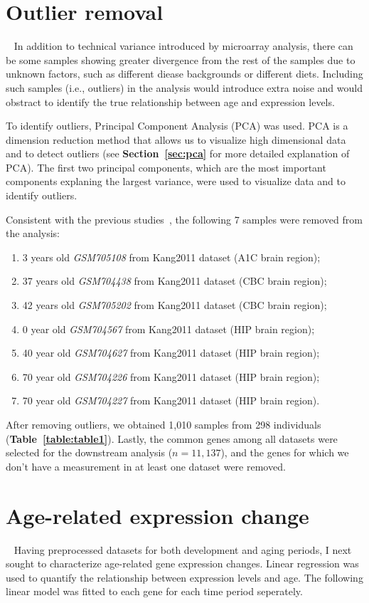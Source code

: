 \section{Outlier removal}~\label{sec:out.rm}
In addition to technical variance introduced by microarray analysis, 
there can be some samples showing greater divergence from the rest of the samples due to unknown factors,
such as different diease backgrounds or different diets.
Including such samples (i.e., outliers) in the analysis would introduce extra noise and would obstract to identify the true relationship between age and expression levels.

To identify outliers, Principal Component Analysis (PCA) was used. 
PCA is a dimension reduction method that allows us to visualize high dimensional data and to detect outliers (see \textbf{Section~\ref{sec:pca}} for more detailed explanation of PCA).
The first two principal components, which are the most important components explaning the largest variance, were used to visualize data and to identify outliers.

Consistent with the previous studies~\cite{Donertas2017,Donertas2018}, the following 7 samples were removed from the analysis: 
\begin{enumerate}
    \item 3 years old \textit{GSM705108} from Kang2011 dataset (A1C brain region);
    \item 37 years old \textit{GSM704438} from Kang2011 dataset (CBC brain region);
    \item 42 years old \textit{GSM705202} from Kang2011 dataset (CBC brain region);
    \item 0 year old \textit{GSM704567} from Kang2011 dataset (HIP brain region);
    \item 40 year old \textit{GSM704627} from Kang2011 dataset (HIP brain region);
    \item 70 year old \textit{GSM704226} from Kang2011 dataset (HIP brain region);
    \item 70 year old \textit{GSM704227} from Kang2011 dataset (HIP brain region).
\end{enumerate}

After removing outliers, we obtained 1,010 samples from 298 individuals (\textbf{Table~\ref{table:table1}}).
Lastly, the common genes among all datasets were selected for the downstream analysis ($n=11,137$), 
and the genes for which we don't have a measurement in at least one dataset were removed.

\section{Age-related expression change}~\label{sec:exp-change}
Having preprocessed datasets for both development and aging periods, I next sought to characterize age-related gene expression changes. 
Linear regression was used to quantify the relationship between expression levels and age. 
The following linear model was fitted to each gene for each time period seperately.

